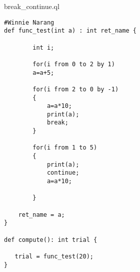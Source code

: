 break\_continue.ql
\begin{lstlisting}
#Winnie Narang
def func_test(int a) : int ret_name { 
        
        int i;

        for(i from 0 to 2 by 1)
        a=a+5;

        for(i from 2 to 0 by -1)
        {
            a=a*10;
            print(a);
            break;
        }

        for(i from 1 to 5)
        {
            print(a);
            continue;
            a=a*10;

        }

    ret_name = a;
}

def compute(): int trial {

   trial = func_test(20);
}
\end{lstlisting}

